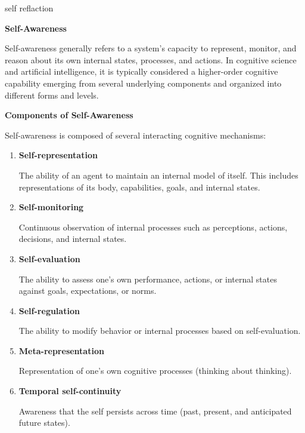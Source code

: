 \documentclass{book}
\providecommand{\ProjectDeepHeading}[2]{%
    \par\medskip\noindent\textbf{#2}\par\smallskip
}
\begin{document}
self reflaction


\ProjectDeepHeading{7}{Self-Awareness}

      Self-awareness generally refers to a system's capacity to represent, monitor, and reason about its own internal states, processes, and actions. In cognitive science and artificial intelligence, it is typically considered a higher-order cognitive capability emerging from several underlying components and organized into different forms and levels.


   \ProjectDeepHeading{7}{Components of Self-Awareness}

      Self-awareness is composed of several interacting cognitive mechanisms:

      \begin{enumerate}[label=\arabic*.]
         \item \textbf{Self-representation}

         The ability of an agent to maintain an internal model of itself. This includes representations of its body, capabilities, goals, and internal states.

         \item \textbf{Self-monitoring}

         Continuous observation of internal processes such as perceptions, actions, decisions, and internal states.

         \item \textbf{Self-evaluation}

         The ability to assess one's own performance, actions, or internal states against goals, expectations, or norms.

         \item \textbf{Self-regulation}

         The ability to modify behavior or internal processes based on self-evaluation.

         \item \textbf{Meta-representation}

         Representation of one's own cognitive processes (thinking about thinking).

         \item \textbf{Temporal self-continuity}

         Awareness that the self persists across time (past, present, and anticipated future states).
      \end{enumerate}
\end{document}
